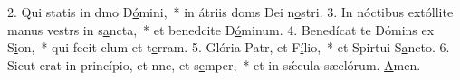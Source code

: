 2. Qui statis in dmo D\uline{ó}mini,~* in átriis doms Dei n\uline{o}stri.
3. In nóctibus extóllite manus vestrs in s\uline{a}ncta,~* et benedcite D\uline{ó}minum.
4. Benedícat te Dómins ex S\uline{i}on,~* qui fecit clum et t\uline{e}rram.
5. Glória Patr, et F\uline{í}lio,~* et Spirtui S\uline{a}ncto.
6. Sicut erat in princípio, et nnc, et s\uline{e}mper,~* et in sǽcula sæclórum. \uline{A}men.
